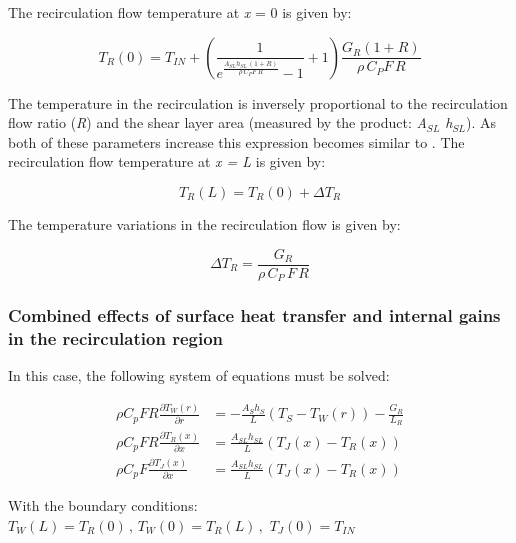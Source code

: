 The recirculation flow temperature at \emph{x} = 0 is given by:

\begin{equation}
{T_R}(0) = {T_{IN}} + \left( {\frac{1}{{{e^{\frac{{{A_{SL}}{h_{SL}}\,(1 + R)}}{{\rho \,{C_P}F\,R}}}} - 1}} + 1} \right)\frac{{{G_R}(1 + R)}}{{\rho \,{C_P}F\,R}}
\end{equation}

The temperature in the recirculation is inversely proportional to the recirculation flow ratio (\emph{R}) and the shear layer area (measured by the product: \emph{A\(_{SL}\) h\(_{SL}\)}). As both of these parameters increase this expression becomes similar to . The recirculation flow temperature at \emph{x = L} is given by:

\begin{equation}
{T_R}(L) = {T_R}(0) + \Delta {T_R}
\end{equation}

The temperature variations in the recirculation flow is given by:

\begin{equation}
\Delta {T_R} = \frac{{{G_R}}}{{\rho \,{C_P}\,F\,R}}
\end{equation}

\subsubsection{Combined effects of surface heat transfer and internal gains in the recirculation region}\label{combined-effects-of-surface-heat-transfer-and-internal-gains-in-the-recirculation-region}

In this case, the following system of equations must be solved:

\begin{equation}
\begin{array}{rl}
    \rho C_p F R \frac{\partial T_W \left(r\right)}{\partial r} & = -\frac{A_S h_S}{L} \left(T_S - T_W \left(r\right)\right) - \frac{G_R}{L_R} \\
    \rho C_p F R \frac{\partial T_R \left(x\right)}{\partial x} & = \frac{A_{SL} h_{SL}}{L} \left(T_J\left(x\right) - T_R \left(x\right)\right) \\
    \rho C_p F \frac{\partial T_J \left(x\right)}{\partial x} & = \frac{A_{SL} h_{SL}}{L} \left(T_J\left(x\right) - T_R \left(x\right)\right) 
  \end{array}
\end{equation}

With the boundary conditions: \({T_W}(L) = {T_R}(0)\,,\,{T_W}(0) = {T_R}(L)\,,\,\,{T_J}(0) = {T_{IN}}\)

